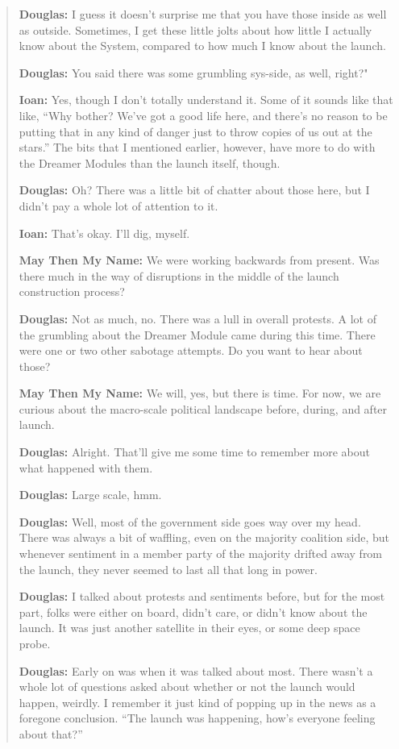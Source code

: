 \begin{quote}
\textbf{Douglas:} I guess it doesn't surprise me that you have those inside as well as outside. Sometimes, I get these little jolts about how little I actually know about the System, compared to how much I know about the launch.

\textbf{Douglas:} You said there was some grumbling sys-side, as well, right?"

\textbf{Ioan:} Yes, though I don't totally understand it. Some of it sounds like that like, ``Why bother? We've got a good life here, and there's no reason to be putting that in any kind of danger just to throw copies of us out at the stars.'' The bits that I mentioned earlier, however, have more to do with the Dreamer Modules than the launch itself, though.

\textbf{Douglas:} Oh? There was a little bit of chatter about those here, but I didn't pay a whole lot of attention to it.

\textbf{Ioan:} That's okay. I'll dig, myself.

\textbf{May Then My Name:} We were working backwards from present. Was there much in the way of disruptions in the middle of the launch construction process?

\textbf{Douglas:} Not as much, no. There was a lull in overall protests. A lot of the grumbling about the Dreamer Module came during this time. There were one or two other sabotage attempts. Do you want to hear about those?

\textbf{May Then My Name:} We will, yes, but there is time. For now, we are curious about the macro-scale political landscape before, during, and after launch.

\textbf{Douglas:} Alright. That'll give me some time to remember more about what happened with them.

\textbf{Douglas:} Large scale, hmm.

\textbf{Douglas:} Well, most of the government side goes way over my head. There was always a bit of waffling, even on the majority coalition side, but whenever sentiment in a member party of the majority drifted away from the launch, they never seemed to last all that long in power.

\textbf{Douglas:} I talked about protests and sentiments before, but for the most part, folks were either on board, didn't care, or didn't know about the launch. It was just another satellite in their eyes, or some deep space probe.

\textbf{Douglas:} Early on was when it was talked about most. There wasn't a whole lot of questions asked about whether or not the launch would happen, weirdly. I remember it just kind of popping up in the news as a foregone conclusion. ``The launch was happening, how's everyone feeling about that?''


\end{quote}
